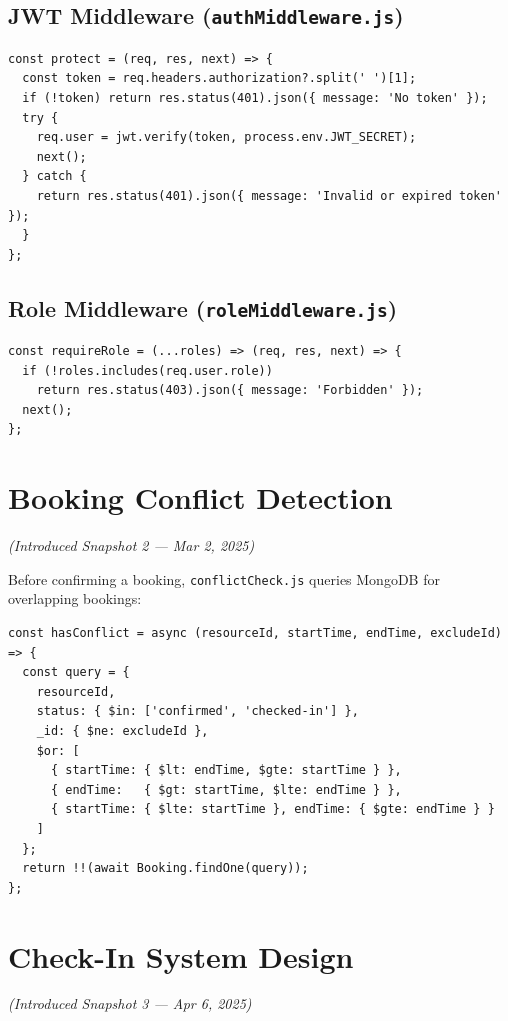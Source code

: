 \documentclass[12pt]{article}
\begin{document}
\subsection{JWT Middleware (\texttt{authMiddleware.js})}
\begin{verbatim}
const protect = (req, res, next) => {
  const token = req.headers.authorization?.split(' ')[1];
  if (!token) return res.status(401).json({ message: 'No token' });
  try {
    req.user = jwt.verify(token, process.env.JWT_SECRET);
    next();
  } catch {
    return res.status(401).json({ message: 'Invalid or expired token' });
  }
};
\end{verbatim}

\subsection{Role Middleware (\texttt{roleMiddleware.js})}
\begin{verbatim}
const requireRole = (...roles) => (req, res, next) => {
  if (!roles.includes(req.user.role))
    return res.status(403).json({ message: 'Forbidden' });
  next();
};
\end{verbatim}

\section{Booking Conflict Detection}
\textit{(Introduced Snapshot 2 --- Mar 2, 2025)}

Before confirming a booking, \texttt{conflictCheck.js} queries MongoDB for overlapping bookings:

\begin{verbatim}
const hasConflict = async (resourceId, startTime, endTime, excludeId) => {
  const query = {
    resourceId,
    status: { $in: ['confirmed', 'checked-in'] },
    _id: { $ne: excludeId },
    $or: [
      { startTime: { $lt: endTime, $gte: startTime } },
      { endTime:   { $gt: startTime, $lte: endTime } },
      { startTime: { $lte: startTime }, endTime: { $gte: endTime } }
    ]
  };
  return !!(await Booking.findOne(query));
};
\end{verbatim}

\section{Check-In System Design}
\textit{(Introduced Snapshot 3 --- Apr 6, 2025)}
\end{document}
